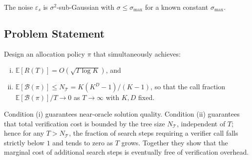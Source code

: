 \begin{assumption}
\label{ass:noise}
The noise $\varepsilon_s$ is $\sigma^2$-sub-Gaussian with $\sigma \leq \sigma_{\max}$
for a known constant $\sigma_{\max}$.
\end{assumption}

\subsection{Problem Statement}

\begin{problem}
\label{prob:main}
Design an allocation policy $\pi$ that simultaneously achieves:
\begin{enumerate}[(i)]
  \item $\mathbb{E}[R(T)] = O(\sqrt{T \log K})$, and
  \item $\mathbb{E}[\mathcal{B}(\pi)] \leq N_{\mathcal{T}} = K(K^D-1)/(K-1)$,
        so that the call fraction $\mathbb{E}[\mathcal{B}(\pi)]/T \to 0$ as $T \to \infty$
        with $K, D$ fixed.
\end{enumerate}
\end{problem}

Condition (i) guarantees near-oracle solution quality. Condition (ii) guarantees that
total verification cost is bounded by the tree size $N_{\mathcal{T}}$, independent of $T$;
hence for any $T > N_{\mathcal{T}}$, the fraction of search steps requiring a verifier
call falls strictly below $1$ and tends to zero as $T$ grows. Together they show that
the marginal cost of additional search steps is eventually free of verification overhead.
